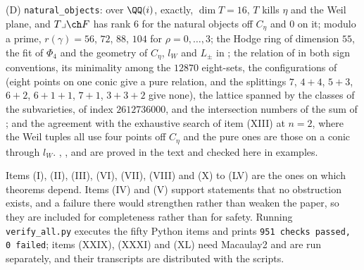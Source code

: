 \begin{enumerate}[label=\textup{(\Roman*)},leftmargin=*]
  (D) \texttt{natural\_\allowbreak objects}: over $\QQ(i)$, exactly, $\dim T=16$,
  $T$ kills $\eta$ and the Weil plane, and $T\lrcorner\ch F$ has rank $6$ for
  the natural objects off $C_{\eta}$ and $0$ on it; modulo a prime,
  $r(\gamma)=56$, $72$, $88$, $104$ for $\rho=0,\dots,3$; the Hodge ring of
  dimension $55$, the fit of $\Phi_{4}$ and the geometry of $C_{\eta}$,
  $l_{W}$ and $L_{\pm}$ in ; the relation of
   in both sign conventions, its minimality among the
  $12870$ eight-sets, the configurations of  (eight
  points on one conic give a pure relation, and the splittings $7$, $4+4$,
  $5+3$, $6+2$, $6+1+1$, $7+1$, $3+3+2$ give none), the lattice spanned by
  the classes of the subvarieties, of index $2612736000$, and the intersection
  numbers of the sum of ; and the agreement with the
  exhaustive search of item (XIII) at $n=2$, where the Weil tuples all use
  four points off $C_{\eta}$ and the pure ones are those on a conic through
  $l_{W}$. , ,
   and  are proved in the text
  and checked here in examples.
\end{enumerate}

Items (I), (II), (III), (VI), (VII), (VIII) and (X) to (LV) are the ones
on which theorems depend. Items (IV) and (V) support statements that no
obstruction exists, and a failure there would strengthen rather than weaken
the paper, so they are included for completeness rather than for safety.
Running \texttt{verify\_all.py} executes the fifty Python items and
prints \texttt{951 checks passed, 0 failed}; items (XXIX), (XXXI) and
(XL) need Macaulay2 and are run separately, and their transcripts are
distributed with the scripts.
